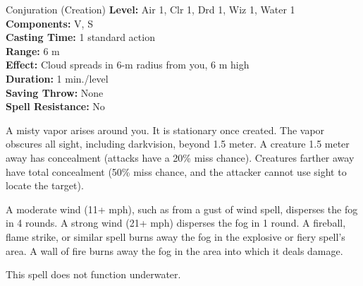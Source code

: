 {Conjuration (Creation)}
{
	\textbf{Level:}
	Air 1, Clr 1, Drd 1, Wiz 1, Water 1\\
	\textbf{Components:}
	V, S\\
	\textbf{Casting Time:}
	1 standard action\\
	\textbf{Range:}
	6 m\\
	\textbf{Effect:}
	Cloud spreads in 6-m radius from you, 6 m high\\
	\textbf{Duration:}
	1 min./level\\
	\textbf{Saving Throw:}
	None\\
	\textbf{Spell Resistance:}
	No\\
}
{
	A misty vapor arises around you. It is stationary once created. The vapor obscures all sight, including darkvision, beyond 1.5 meter. A creature 1.5 meter away has concealment (attacks have a 20\% miss chance). Creatures farther away have total concealment (50\% miss chance, and the attacker cannot use sight to locate the target).

	A moderate wind (11+ mph), such as from a gust of wind spell, disperses the fog in 4 rounds. A strong wind (21+ mph) disperses the fog in 1 round. A fireball, flame strike, or similar spell burns away the fog in the explosive or fiery spell's area. A wall of fire burns away the fog in the area into which it deals damage.

	This spell does not function underwater.

}
